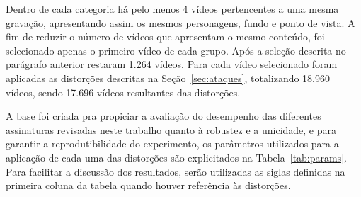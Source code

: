 Dentro de cada categoria há pelo menos 4 vídeos pertencentes a uma mesma gravação, apresentando assim os mesmos personagens, fundo e ponto de vista. A fim de reduzir o número de vídeos que apresentam o mesmo conteúdo, foi selecionado apenas o primeiro vídeo de cada grupo. Após a seleção descrita no parágrafo anterior restaram 1.264 vídeos. Para cada vídeo selecionado foram aplicadas as distorções descritas na Seção~\ref{sec:ataques}, totalizando 18.960 vídeos, sendo 17.696 vídeos resultantes das distorções.


A base foi criada pra propiciar a avaliação do desempenho das diferentes assinaturas revisadas neste trabalho quanto à robustez e a unicidade, e para garantir a reprodutibilidade do experimento, os parâmetros utilizados para a aplicação de cada uma das distorções são explicitados na Tabela~\ref{tab:params}. Para facilitar a discussão dos resultados, serão utilizadas as siglas definidas na primeira coluna da tabela quando houver referência às distorções.


